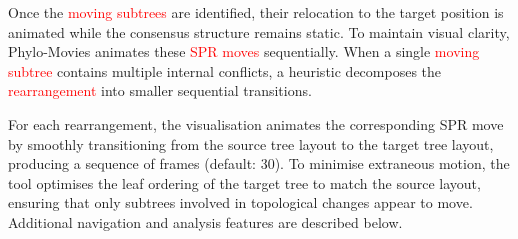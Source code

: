 
Once the \textcolor{red}{moving subtrees} are identified, their relocation to the target position is animated while the consensus structure remains static. To maintain visual clarity, Phylo-Movies animates these \textcolor{red}{SPR moves} sequentially. When a single \textcolor{red}{moving subtree} contains multiple internal conflicts, a heuristic decomposes the \textcolor{red}{rearrangement} into smaller sequential transitions.

For each rearrangement, the visualisation animates the corresponding SPR move by smoothly transitioning from the source tree layout to the target tree layout, producing a sequence of frames (default: 30). To minimise extraneous motion, the tool optimises the leaf ordering of the target tree to match the source layout, ensuring that only subtrees involved in topological changes appear to move. Additional navigation and analysis features are described below.

